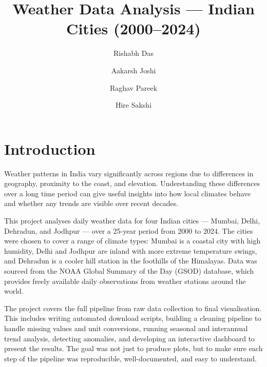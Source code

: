 


\title{Weather Data Analysis --- Indian Cities (2000--2024)}

\author{
    \small Rishabh Das \and
    \small Aakarsh Joshi \and
    \small Raghav Pareek \and
    \small Hire Sakshi
    }





\maketitle




\section{Introduction}
Weather patterns in India vary significantly across regions due to differences
in geography, proximity to the coast, and elevation. Understanding these
differences over a long time period can give useful insights into how local
climates behave and whether any trends are visible over recent decades.

This project analyses daily weather data for four Indian cities --- Mumbai,
Delhi, Dehradun, and Jodhpur --- over a 25-year period from 2000 to 2024.
The cities were chosen to cover a range of climate types: Mumbai is a coastal
city with high humidity, Delhi and Jodhpur are inland with more extreme
temperature swings, and Dehradun is a cooler hill station in the foothills
of the Himalayas. Data was sourced from the NOAA Global Summary of the Day
(GSOD) database, which provides freely available daily observations from
weather stations around the world.

The project covers the full pipeline from raw data collection to final
visualisation. This includes writing automated download scripts, building a
cleaning pipeline to handle missing values and unit conversions, running
seasonal and interannual trend analysis, detecting anomalies, and developing
an interactive dashboard to present the results. The goal was not just to
produce plots, but to make sure each step of the pipeline was reproducible,
well-documented, and easy to understand.

